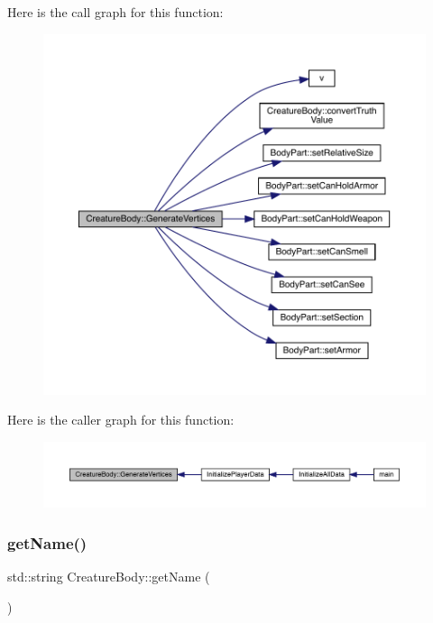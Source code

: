 Here is the call graph for this function\+:
\nopagebreak
\begin{figure}[H]
\begin{center}
\leavevmode
\includegraphics[width=350pt]{da/d7d/class_creature_body_af7047fb13005abbb9a816c0dd64af873_cgraph}
\end{center}
\end{figure}
Here is the caller graph for this function\+:
\nopagebreak
\begin{figure}[H]
\begin{center}
\leavevmode
\includegraphics[width=350pt]{da/d7d/class_creature_body_af7047fb13005abbb9a816c0dd64af873_icgraph}
\end{center}
\end{figure}
\mbox{\label{class_creature_body_abfbe9ab6a145745934fc7fafefccdb67}} 
\subsubsection{\texorpdfstring{get\+Name()}{getName()}}
{\footnotesize\ttfamily std\+::string Creature\+Body\+::get\+Name (\begin{DoxyParamCaption}{ }\end{DoxyParamCaption})}

